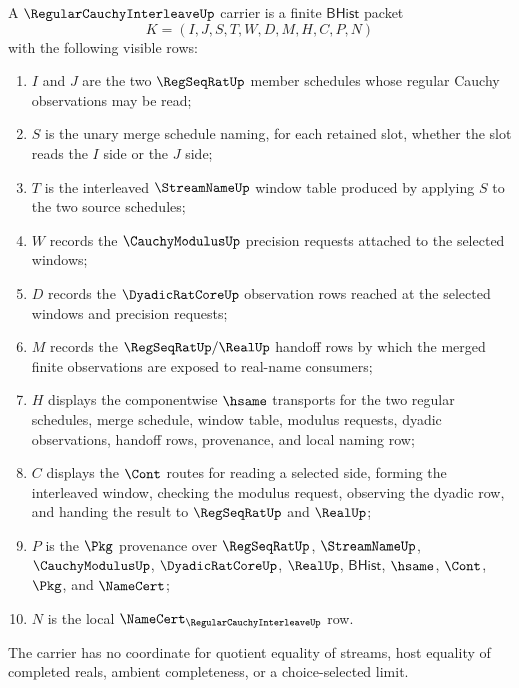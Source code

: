 \begin{definition}
\label{def:regular-cauchy-interleave-carrier}
A $\RegularCauchyInterleaveUp$ carrier is a finite $\mathsf{BHist}$ packet
$$
K=(I,J,S,T,W,D,M,H,C,P,N)
$$
with the following visible rows:
\begin{enumerate}
\item $I$ and $J$ are the two $\RegSeqRatUp$ member schedules whose regular Cauchy observations may be read;
\item $S$ is the unary merge schedule naming, for each retained slot, whether the slot reads the $I$ side or the $J$ side;
\item $T$ is the interleaved $\StreamNameUp$ window table produced by applying $S$ to the two source schedules;
\item $W$ records the $\CauchyModulusUp$ precision requests attached to the selected windows;
\item $D$ records the $\DyadicRatCoreUp$ observation rows reached at the selected windows and precision requests;
\item $M$ records the $\RegSeqRatUp/\RealUp$ handoff rows by which the merged finite observations are exposed to real-name consumers;
\item $H$ displays the componentwise $\hsame$ transports for the two regular schedules, merge schedule, window table, modulus requests, dyadic observations, handoff rows, provenance, and local naming row;
\item $C$ displays the $\Cont$ routes for reading a selected side, forming the interleaved window, checking the modulus request, observing the dyadic row, and handing the result to $\RegSeqRatUp$ and $\RealUp$;
\item $P$ is the $\Pkg$ provenance over $\RegSeqRatUp$, $\StreamNameUp$, $\CauchyModulusUp$, $\DyadicRatCoreUp$, $\RealUp$, $\mathsf{BHist}$, $\hsame$, $\Cont$, $\Pkg$, and $\NameCert$;
\item $N$ is the local $\NameCert_{\RegularCauchyInterleaveUp}$ row.
\end{enumerate}
The carrier has no coordinate for quotient equality of streams, host equality of completed reals, ambient completeness, or a choice-selected limit.
\end{definition}


